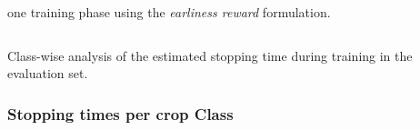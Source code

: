 \begin{frame}
	
	
	
	
\end{frame}



\begin{frame}
	
	
	


	\begin{columns}

	\column{\textwidth}
\figearlyreward
{one training phase using the \emph{earliness reward} formulation.}
\end{columns}
	
\end{frame}

\begin{frame}
	
	
		
		{Class-wise analysis of the estimated stopping time during training in the evaluation set.}
	
\end{frame}

\begin{frame}
\frametitle{Stopping times per crop Class}



\end{frame}


